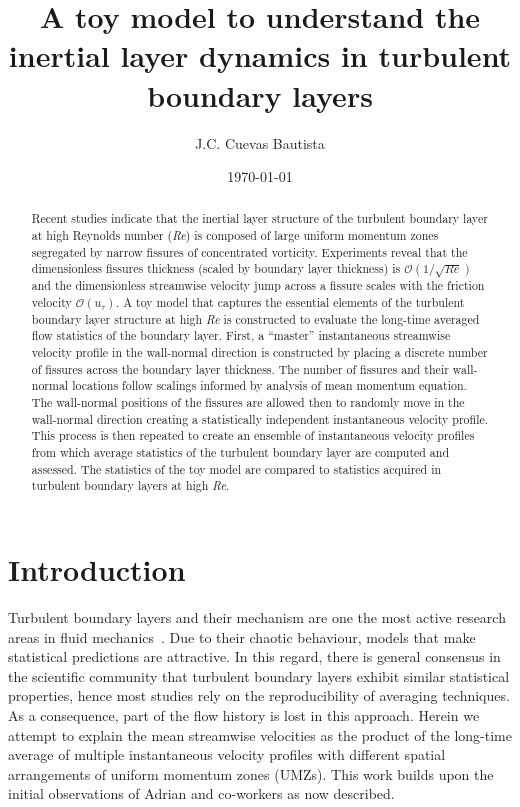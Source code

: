 \documentclass[aps,reprint,amsmath,amssymb,pra]{revtex4-1}%
\begin{document}
\title{A toy model to understand the inertial layer dynamics in turbulent boundary layers}
\author{J.C. Cuevas Bautista}
\date{\today}
\begin{abstract}
\noindent 
Recent studies indicate that the inertial layer structure of the turbulent boundary layer at high Reynolds number (\textit{Re}) is composed of large uniform momentum zones segregated by narrow fissures of concentrated vorticity. Experiments reveal that the dimensionless fissures thickness (scaled by boundary layer thickness) is $\mathcal{O}(1/\sqrt{Re})$ and the dimensionless streamwise velocity jump across a fissure scales with the friction velocity $\mathcal{O}(u_{\tau})$. A toy model that captures the essential elements of the turbulent boundary layer structure at high \textit{Re} is constructed to evaluate the long-time averaged flow statistics of the boundary layer. First, a ``master'' instantaneous  streamwise velocity profile in the wall-normal direction is constructed by placing a discrete number of fissures across the boundary layer thickness. The number of fissures and their wall-normal locations follow scalings informed by analysis of mean momentum equation. The wall-normal positions of the fissures are allowed then to randomly move in the wall-normal direction creating a statistically independent instantaneous velocity profile. This process is then repeated to create an ensemble of instantaneous velocity profiles from which average statistics of the turbulent boundary layer are computed and assessed. The statistics of the toy model are compared to statistics acquired in turbulent boundary layers at high \textit{Re}.
\end{abstract}
\maketitle
\section{\label{sec:intro} Introduction}
Turbulent boundary layers and their mechanism are one the most active research areas in fluid mechanics~\cite{kline1967,head1981,heist2000}. Due to their chaotic behaviour, models that make statistical predictions are attractive. In this regard, there is general consensus in the scientific community that turbulent boundary layers exhibit similar statistical properties, hence most studies rely on the reproducibility of averaging techniques.  As a consequence, part of the flow history is lost in this approach. Herein we attempt to explain the mean streamwise velocities as the product of the long-time average of multiple instantaneous velocity profiles with different spatial arrangements of uniform momentum zones (UMZs). This work builds upon the initial observations of Adrian and co-workers as now described.%
\end{document}
